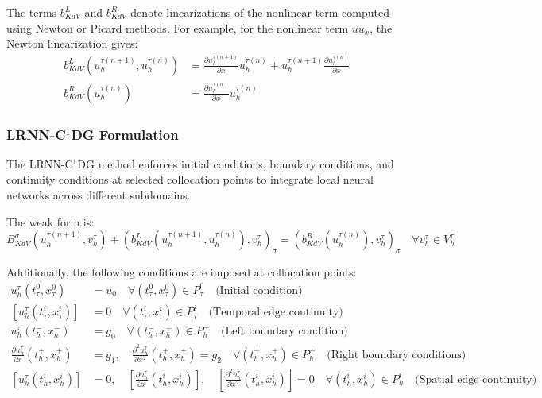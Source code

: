 \documentclass[11pt,a4paper]{article}
\begin{document}
The terms $b_{KdV}^L$ and $b_{KdV}^R$ denote linearizations of the nonlinear term computed using Newton or Picard methods. For example, for the nonlinear term $u u_x$, the Newton linearization gives:
\begin{align}
b_{KdV}^L(u_h^{\tau(n+1)}, u_h^{\tau(n)}) &= \frac{\partial u_h^{\tau(n+1)}}{\partial x} u_h^{\tau(n)} + u_h^{\tau(n+1)} \frac{\partial u_h^{\tau(n)}}{\partial x} \\
b_{KdV}^R(u_h^{\tau(n)}) &= \frac{\partial u_h^{\tau(n)}}{\partial x} u_h^{\tau(n)}
\end{align}

\subsubsection{LRNN-C$^1$DG Formulation}

The LRNN-C$^1$DG method enforces initial conditions, boundary conditions, and continuity conditions at selected collocation points to integrate local neural networks across different subdomains.

The weak form is:
\begin{equation}
B_{KdV}^\sigma(u_h^{\tau(n+1)}, v_h^\tau) + \left(b_{KdV}^L(u_h^{\tau(n+1)}, u_h^{\tau(n)}), v_h^\tau\right)_\sigma = \left(b_{KdV}^R(u_h^{\tau(n)}), v_h^\tau\right)_\sigma \quad \forall v_h^\tau \in V_h^\tau
\end{equation}

Additionally, the following conditions are imposed at collocation points:
\begin{align}
u_h^\tau(t_\tau^0, x_\tau^0) &= u_0 \quad \forall (t_\tau^0, x_\tau^0) \in P_\tau^0 \quad \text{(Initial condition)} \\
[u_h^\tau(t_\tau^i, x_\tau^i)] &= 0 \quad \forall (t_\tau^i, x_\tau^i) \in P_\tau^i \quad \text{(Temporal edge continuity)} \\
u_h^\tau(t_h^-, x_h^-) &= g_0 \quad \forall (t_h^-, x_h^-) \in P_h^- \quad \text{(Left boundary condition)} \\
\frac{\partial u_h^\tau}{\partial x}(t_h^+, x_h^+) &= g_1, \quad \frac{\partial^2 u_h^\tau}{\partial x^2}(t_h^+, x_h^+) = g_2 \quad \forall (t_h^+, x_h^+) \in P_h^+ \quad \text{(Right boundary conditions)} \\
[u_h^\tau(t_h^i, x_h^i)] &= 0, \quad \left[\frac{\partial u_h^\tau}{\partial x}(t_h^i, x_h^i)\right], \quad \left[\frac{\partial^2 u_h^\tau}{\partial x^2}(t_h^i, x_h^i)\right] = 0 \quad \forall (t_h^i, x_h^i) \in P_h^i \quad \text{(Spatial edge continuity)}
\end{align}
\end{document}
